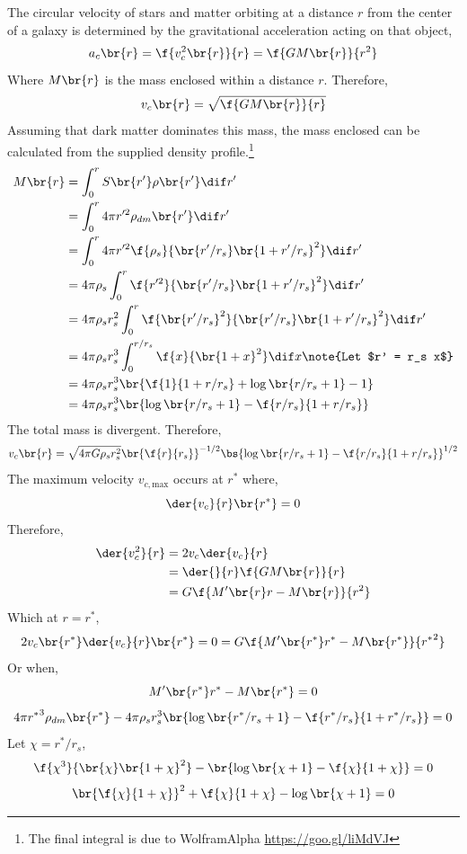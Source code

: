 \documentclass{article}
\begin{document}
The circular velocity of stars and matter orbiting at a distance $r$ from the center of a galaxy is determined by the gravitational acceleration acting on that object,
\[ a_c\br{r} = \f{v_c^{2}\br{r}}{r} = \f{G M \br{r}}{r^2} \]
Where $M\br{r}$ is the mass enclosed within a distance $r$. Therefore,
\[ v_c\br{r} = \sqrt{\f{G M \br{r}}{r}} \]
Assuming that dark matter dominates this mass, the mass enclosed can be calculated from the supplied density profile.\footnote{The final integral is due to WolframAlpha \url{https://goo.gl/liMdVJ}}
\begin{align*}
M\br{r}
&= \int_{0}^{r} S\br{r'} \rho\br{r'} \dif r' \\
&= \int_{0}^{r} 4 \pi r'^2 \rho_{dm}\br{r'} \dif r' \\
&= \int_{0}^{r} 4 \pi r'^2 \f{\rho_s}{\br{r'/r_s} \br{1 + r'/r_s}^2} \dif r' \\
&= 4 \pi \rho_s \int_{0}^{r}  \f{r'^2}{\br{r'/r_s} \br{1 + r'/r_s}^2} \dif r' \\
&= 4 \pi \rho_s r_s^2 \int_{0}^{r} \f{\br{r'/r_s}^2}{\br{r'/r_s} \br{1 + r'/r_s}^2} \dif r' \\
&= 4 \pi \rho_s r_s^3 \int_{0}^{r / r_s} \f{x}{\br{1 + x}^2} \dif x \note{Let $r' = r_s x$} \\\
&= 4 \pi \rho_s r_s^3 \br{\f{1}{1 + r/r_s} + \log\br{r/r_s+1} - 1} \\
&= 4 \pi \rho_s r_s^3 \br{\log\br{r/r_s+1}-\f{r/r_s}{1 + r/r_s}}
\end{align*}
The total mass is divergent. Therefore,
\[ v_c\br{r} = \sqrt{4 \pi G \rho_s r_s^2} \br{\f{r}{r_s}}^{-1/2} \bs{\log\br{r/r_s+1}-\f{r/r_s}{1 + r/r_s}}^{1/2} \]
The maximum velocity $v_{c,\text{max}}$ occurs at $r^*$ where,
\[ \der{v_{c}}{r}\br{r^{*}} = 0 \]
Therefore,
\begin{align*}
    \der{v^2_{c}}{r}
    &= 2v_{c}\der{v_{c}}{r} \\
    &= \der{}{r} \f{G M \br{r}}{r} \\
    &= G \f{M' \br{r} r - M \br{r}}{r^2}
\end{align*}
Which at $r = r^{*}$,
\[ 2v_{c}\br{r^{*}}\der{v_{c}}{r}\br{r^{*}} = 0 = G \f{M' \br{r^{*}} r^{*} - M \br{r^{*}}}{{r^{*}}^2} \]
Or when,
\[ M' \br{r^{*}} r^{*} - M \br{r^{*}} = 0 \]
\[ 4 \pi {r^{*}}^3 \rho_{dm}\br{r^{*}} - 4 \pi \rho_s r_s^3 \br{\log\br{r^{*}/r_s+1}-\f{r^{*}/r_s}{1 + r^{*}/r_s}} = 0 \]
Let $\chi = r^{*} / r_s$,
\[  \f{\chi^3}{\br{\chi} \br{1 + \chi}^2} - \br{\log\br{\chi+1}-\f{\chi}{1 + \chi}} = 0 \]
\[  \br{\f{\chi}{1 + \chi}}^2 +\f{\chi}{1 + \chi}- \log\br{\chi+1} = 0 \]
\end{document}
